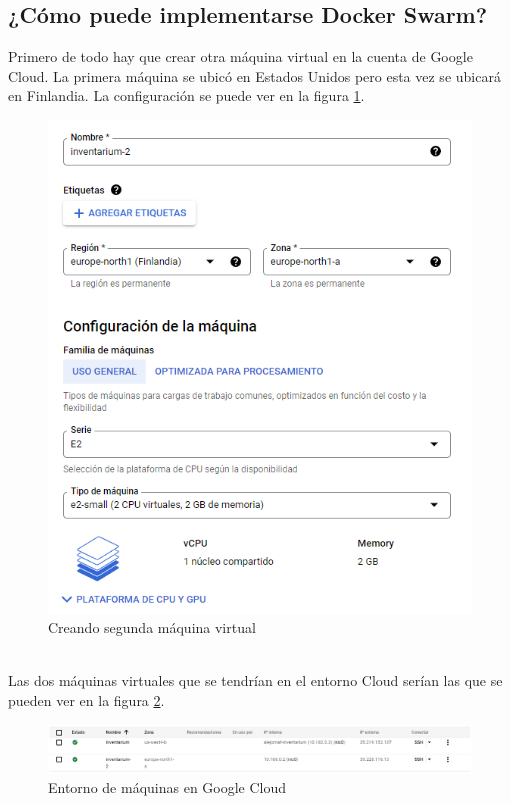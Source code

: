 \subsection{¿Cómo puede implementarse Docker Swarm?}
Primero de todo hay que crear otra máquina virtual en la cuenta de Google Cloud. La primera máquina se ubicó en Estados Unidos pero esta vez se ubicará en Finlandia. La configuración se puede ver en la figura \ref{fig:creando-segunda-maquina}.
\begin{figure}
    \centering
    \includegraphics[scale=0.6, keepaspectratio]{imagenes/complemento/docker-swarm/creating_second_virtual_machine.png}
    \caption{Creando segunda máquina virtual}\label{fig:creando-segunda-maquina}
\end{figure}
\\Las dos máquinas virtuales que se tendrían en el entorno Cloud serían las que se pueden ver en la figura \ref{fig:entorno-maquinas-cloud}.
\begin{figure}
    \centering
    \includegraphics[scale=0.45, keepaspectratio]{imagenes/complemento/docker-swarm/virtual_machines_on_google_cloud.png}
    \caption{Entorno de máquinas en Google Cloud}\label{fig:entorno-maquinas-cloud}
\end{figure}
